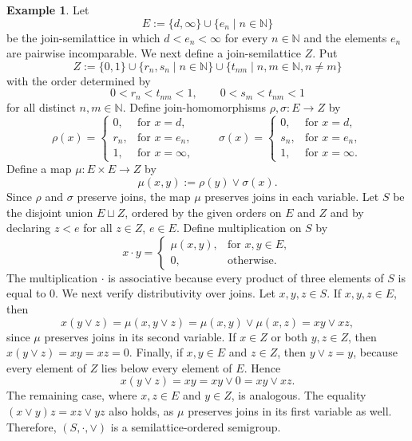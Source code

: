 \documentclass[10pt, reqno]{amsart}
\theoremstyle{plain}
\theoremstyle{definition}
\newtheorem{example}[theorem]{Example}
\begin{document}
\begin{example}\label{separate_spectrality_does_not_imply_joint}
    Let $$E := \{d, \infty\} \cup \{e_n \mid n \in \mathbb{N}\}$$ be the join-semilattice in which $d < e_n < \infty$ for every $n\in\mathbb{N}$ and the elements $e_n$ are pairwise incomparable. We next define a join-semilattice $Z$. Put $$Z := \{0, 1\} \cup \{r_n, s_n \mid n \in \mathbb{N}\} \cup \{t_{nm} \mid n, m\in\mathbb{N}, n \neq m\}$$ with the order determined by $$0 < r_n < t_{nm} < 1, \qquad 0 < s_m < t_{nm} < 1$$ for all distinct $n, m\in\mathbb{N}$. Define join-homomorphisms $\rho, \sigma: E \to Z$ by
    $$\rho(x) = \begin{cases}
        0, & \text{for } x = d, \\
        r_n, & \text{for } x = e_n, \\
        1, & \text{for } x = \infty, 
    \end{cases}
    \qquad \sigma(x) = \begin{cases}
        0, & \text{for } x = d, \\ 
        s_n, & \text{for } x = e_n, \\ 
        1, & \text{for } x = \infty. 
    \end{cases}$$ Define a map $\mu: E \times E \to Z$ by $$\mu(x, y) := \rho(y) \lor \sigma(x).$$ Since $\rho$ and $\sigma$ preserve joins, the map $\mu$ preserves joins in each variable. Let $S$ be the disjoint union $E \sqcup Z$, ordered by the given orders on $E$ and $Z$ and by declaring $z < e$ for all $z\in Z$, $e\in E$. Define multiplication on $S$ by 
    \begin{equation}\label{definition_of_multiplication}
        x\cdot y = \begin{cases}
        \mu(x, y), & \text{for } x, y \in E, \\ 
        0, & \text{otherwise.}
    \end{cases}
    \end{equation}
    The multiplication $\cdot$ is associative because every product of three elements of $S$ is equal to $0$. We next verify distributivity over joins. Let $x, y, z\in S$. If $x, y, z\in E$, then $$x(y \lor z) = \mu(x, y\lor z) = \mu(x, y) \lor \mu(x, z) = xy \lor xz,$$ since $\mu$ preserves joins in its second variable. If $x \in Z$ or both $y, z\in Z$, then $x(y \lor z) = xy = xz = 0$. Finally, if $x, y \in E$ and $z \in Z$, then $y \lor z = y$, because every element of $Z$ lies below every element of $E$. Hence $$x(y \lor z) = xy = xy \lor 0 = xy \lor xz.$$ The remaining case, where $x, z\in E$ and $y\in Z$, is analogous. The equality $(x \lor y)z = xz \lor yz$ also holds, as $\mu$ preserves joins in its first variable as well. Therefore, $(S, \cdot, \lor)$ is a semilattice-ordered semigroup. 
    

\end{example}
\end{document}
